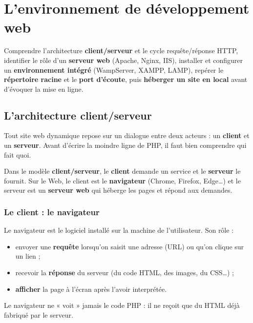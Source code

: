\chapter{L'environnement de développement web}

\begin{synthese}[Au programme]
Comprendre l'architecture \textbf{client/serveur} et le cycle requête/réponse HTTP,
identifier le rôle d'un \textbf{serveur web} (Apache, Nginx, IIS), installer et
configurer un \textbf{environnement intégré} (WampServer, XAMPP, LAMP), repérer le
\textbf{répertoire racine} et le \textbf{port d'écoute}, puis \textbf{héberger un
site en local} avant d'évoquer la mise en ligne.
\end{synthese}

\section{L'architecture client/serveur}

Tout site web dynamique repose sur un dialogue entre deux acteurs : un
\textbf{client} et un \textbf{serveur}. Avant d'écrire la moindre ligne de PHP, il
faut bien comprendre qui fait quoi.

\begin{definition}
Dans le modèle \textbf{client/serveur}, le \textbf{client} demande un service et le
\textbf{serveur} le fournit. Sur le Web, le client est le \textbf{navigateur}
(Chrome, Firefox, Edge\dots) et le serveur est un \textbf{serveur web} qui héberge
les pages et répond aux demandes.
\end{definition}

\subsection{Le client : le navigateur}

Le navigateur est le logiciel installé sur la machine de l'utilisateur. Son rôle :
\begin{itemize}
  \item envoyer une \textbf{requête} lorsqu'on saisit une adresse (URL) ou qu'on
        clique sur un lien ;
  \item recevoir la \textbf{réponse} du serveur (du code HTML, des images, du CSS\dots) ;
  \item \textbf{afficher} la page à l'écran après l'avoir interprétée.
\end{itemize}
Le navigateur ne « voit » jamais le code PHP : il ne reçoit que du HTML déjà
fabriqué par le serveur.

